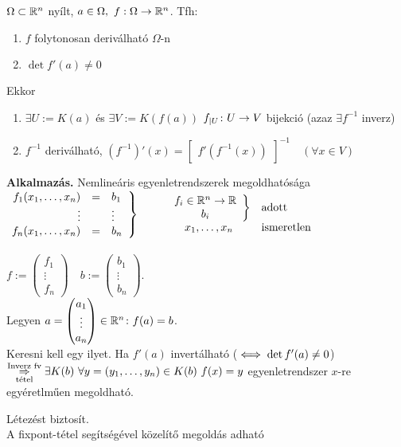\begin{te} $\Omega \subset \mathbb{R}^n$ nyílt, $a\in\Omega,\ f:\Omega\to\mathbb{R}^n$. Tfh:
  {\listazjromai \begin{enumerate}
  \item $f$ folytonosan deriválható $\Omega$-n
  \item $\det f'(a) \neq 0$
  \end{enumerate} }
  Ekkor
  { \listazjbetu \begin{enumerate}
  \item $\exists U := K(a)$ és $\exists V:= K(f(a))$ $f_{|U}\colon U\to V$ bijekció (azaz $\exists f^{-1}$ inverz)
  \item $f^{-1}$ deriválható, $(f^{-1})'(x) = \begin{bmatrix} f'(f^{-1}(x))\end{bmatrix}^{-1}\quad (\forall x\in V)$
  \end{enumerate}
  }
\end{te}
\textbf{Alkalmazás.} Nemlineáris egyenletrendszerek megoldhatósága\\
$\left.\!\begin{array}{rcl}
f_1(x_1,\dotsc,x_n) & = & b_1\\
\vdots & & \vdots\\
f_n(x_1,\dotsc,x_n) & = & b_n\end{array}\right\}\qquad \begin{array}{cl} \left.\begin{array}{c}f_i\in\mathbb{R}^n\to\mathbb{R}\\b_i\end{array}
\right\} &\text{adott}\\x_1,\dotsc,x_n&\text{ismeretlen}\end{array}$\\
\vphantom{x}\\
$f := \begin{pmatrix}f_1\\\vdots\\f_n\end{pmatrix}\quad b := \begin{pmatrix}b_1\\\vdots\\b_n\end{pmatrix}$.\\
Legyen $a=\begin{pmatrix}a_1\\\vdots\\a_n\end{pmatrix}\in\mathbb{R}^n\colon f(a)=b$.\\
Keresni kell egy ilyet. Ha $f'(a)$
invertálható ($\iff \det f'(a)\neq 0$) $\overset{\text{Inverz fv}}{\underset{\text{tétel}}{\Rightarrow}}\\
\exists K(b)\ \forall y=(y_1,\dotsc,y_n)\in K(b)\ f(x)=y$ egyenletrendszer $x$-re egyéretlműen megoldható.
\begin{megj}Létezést biztosít.\\
A fixpont-tétel segítségével közelítő megoldás adható\end{megj}


